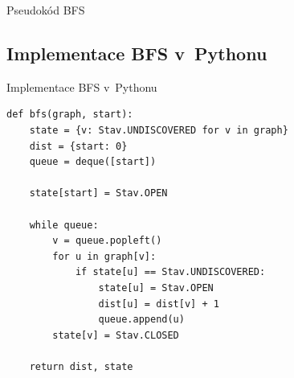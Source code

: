 \documentclass[11pt,professionalfont,aspectratio=43]{beamer}
\begin{document}
    \begin{frame}{Pseudokód BFS}
        \begin{center}
            \begin{minipage}{0.9\textwidth}
                \begin{algorithm}[H]
                    \caption{BFS (pokračování)}
                    \setcounter{AlgoLine}{5}
                \end{algorithm}
            \end{minipage}
        \end{center}
    \end{frame}

    \subsection{Implementace BFS v~Pythonu}

    \begin{frame}[fragile]{Implementace BFS v~Pythonu}
        \begin{lstlisting}[style=python]
def bfs(graph, start):
    state = {v: Stav.UNDISCOVERED for v in graph}
    dist = {start: 0}
    queue = deque([start])

    state[start] = Stav.OPEN

    while queue:
        v = queue.popleft()
        for u in graph[v]:
            if state[u] == Stav.UNDISCOVERED:
                state[u] = Stav.OPEN
                dist[u] = dist[v] + 1
                queue.append(u)
        state[v] = Stav.CLOSED

    return dist, state
        \end{lstlisting}
    \end{frame}
\end{document}
